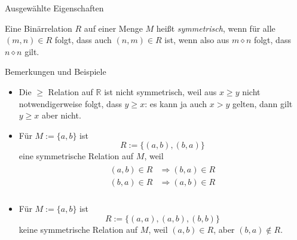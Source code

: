 \documentclass[
  8pt,
  ignorenonframetext,
]{beamer}
\providecommand{\tightlist}{%
  \setlength{\itemsep}{0pt}\setlength{\parskip}{0pt}}
\begin{document}
\begin{frame}{Ausgewählte Eigenschaften}
\protect\hypertarget{ausgewuxe4hlte-eigenschaften-2}{}
\small
\begin{definition}[Symmetrie]
\justifying
Eine Binärrelation $R$ auf einer Menge $M$ heißt \textit{symmetrisch}, wenn für alle
$(m,n)\in R$ folgt, dass auch $(n,m)\in R$ ist, wenn also aus $m \diamond n$ folgt,
dass $n \diamond n$ gilt.
\end{definition}

\footnotesize

Bemerkungen und Beispiele

\begin{itemize}
\tightlist
\item
  Die \(\ge\) Relation auf \(\mathbb{R}\) ist nicht symmetrisch, weil
  aus \(x \ge y\) nicht notwendigerweise folgt, dass \(y \ge x\): es
  kann ja auch \(x>y\) gelten, dann gilt \(y \ge x\) aber nicht.
\item
  Für \(M := \{a,b\}\) ist \begin{equation}
  R := \{(a,b), (b,a)\}
  \end{equation} eine symmetrische Relation auf \(M\), weil
  \begin{align}
  \begin{split}
  (a,b) \in R & \Rightarrow (b,a) \in R \\
  (b,a) \in R & \Rightarrow (a,b) \in R \\
  \end{split}
  \end{align}
\item
  Für \(M := \{a,b\}\) ist \begin{equation}
  R := \{(a,a), (a,b), (b,b)\}
  \end{equation} keine symmetrische Relation auf \(M\), weil
  \((a,b) \in R\), aber \((b,a) \notin R\).
\end{itemize}
\end{frame}
\end{document}
